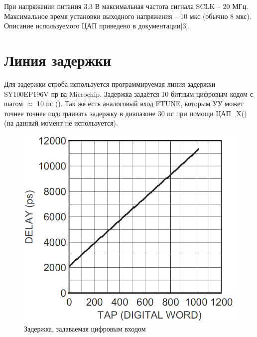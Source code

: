 При напряжении питания 3.3 В максимальная частота сигнала SCLK -- 20 МГц. Максимальное время установки
выходного напряжения -- 10 мкс (обычно 8 мкс). Описание используемого ЦАП приведено в документации[3].

\section{Линия задержки}

Для задержки строба используется программируемая линия задержки SY100EP196V пр-ва Microchip.
Задержка задаётся 10-битным цифровым кодом с шагом $ \approx $ 10 пс ().
Так же есть аналоговый вход FTUNE, которым УУ может точнее точнее подстраивать
задержку в диапазоне 30 пс при помощи ЦАП\_X() (на данный момент не используется).

\FloatBarrier

\begin{figure}[ht!] 
	\center
	\includegraphics [scale=0.6] {my_folder/images//dline_code}
	\caption{Задержка, задаваемая цифровым входом} 
	\label{fig:dline-code}  
\end{figure}

